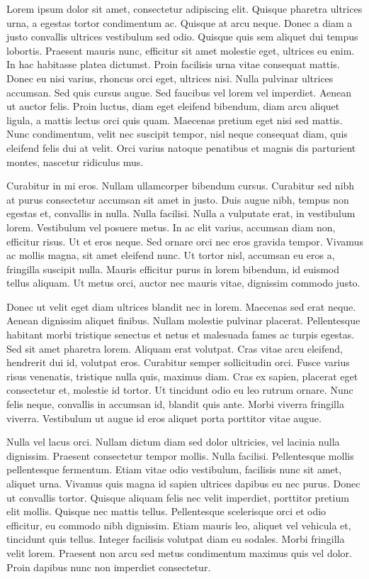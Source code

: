 \documentclass[../00_main.tex]{subfiles}
\begin{document}
Lorem ipsum dolor sit amet, consectetur adipiscing elit. Quisque pharetra ultrices urna, a egestas tortor condimentum ac. Quisque at arcu neque. Donec a diam a justo convallis ultrices vestibulum sed odio. Quisque quis sem aliquet dui tempus lobortis. Praesent mauris nunc, efficitur sit amet molestie eget, ultrices eu enim. In hac habitasse platea dictumst. Proin facilisis urna vitae consequat mattis. Donec eu nisi varius, rhoncus orci eget, ultrices nisi. Nulla pulvinar ultrices accumsan. Sed quis cursus augue. Sed faucibus vel lorem vel imperdiet. Aenean ut auctor felis. Proin luctus, diam eget eleifend bibendum, diam arcu aliquet ligula, a mattis lectus orci quis quam. Maecenas pretium eget nisi sed mattis. Nunc condimentum, velit nec suscipit tempor, nisl neque consequat diam, quis eleifend felis dui at velit. Orci varius natoque penatibus et magnis dis parturient montes, nascetur ridiculus mus.

Curabitur in mi eros. Nullam ullamcorper bibendum cursus. Curabitur sed nibh at purus consectetur accumsan sit amet in justo. Duis augue nibh, tempus non egestas et, convallis in nulla. Nulla facilisi. Nulla a vulputate erat, in vestibulum lorem. Vestibulum vel posuere metus. In ac elit varius, accumsan diam non, efficitur risus. Ut et eros neque. Sed ornare orci nec eros gravida tempor. Vivamus ac mollis magna, sit amet eleifend nunc. Ut tortor nisl, accumsan eu eros a, fringilla suscipit nulla. Mauris efficitur purus in lorem bibendum, id euismod tellus aliquam. Ut metus orci, auctor nec mauris vitae, dignissim commodo justo.

Donec ut velit eget diam ultrices blandit nec in lorem. Maecenas sed erat neque. Aenean dignissim aliquet finibus. Nullam molestie pulvinar placerat. Pellentesque habitant morbi tristique senectus et netus et malesuada fames ac turpis egestas. Sed sit amet pharetra lorem. Aliquam erat volutpat. Cras vitae arcu eleifend, hendrerit dui id, volutpat eros. Curabitur semper sollicitudin orci. Fusce varius risus venenatis, tristique nulla quis, maximus diam. Cras ex sapien, placerat eget consectetur et, molestie id tortor. Ut tincidunt odio eu leo rutrum ornare. Nunc felis neque, convallis in accumsan id, blandit quis ante. Morbi viverra fringilla viverra. Vestibulum ut augue id eros aliquet porta porttitor vitae augue.

Nulla vel lacus orci. Nullam dictum diam sed dolor ultricies, vel lacinia nulla dignissim. Praesent consectetur tempor mollis. Nulla facilisi. Pellentesque mollis pellentesque fermentum. Etiam vitae odio vestibulum, facilisis nunc sit amet, aliquet urna. Vivamus quis magna id sapien ultrices dapibus eu nec purus. Donec ut convallis tortor. Quisque aliquam felis nec velit imperdiet, porttitor pretium elit mollis. Quisque nec mattis tellus. Pellentesque scelerisque orci et odio efficitur, eu commodo nibh dignissim. Etiam mauris leo, aliquet vel vehicula et, tincidunt quis tellus. Integer facilisis volutpat diam eu sodales. Morbi fringilla velit lorem. Praesent non arcu sed metus condimentum maximus quis vel dolor. Proin dapibus nunc non imperdiet consectetur.
\end{document}
